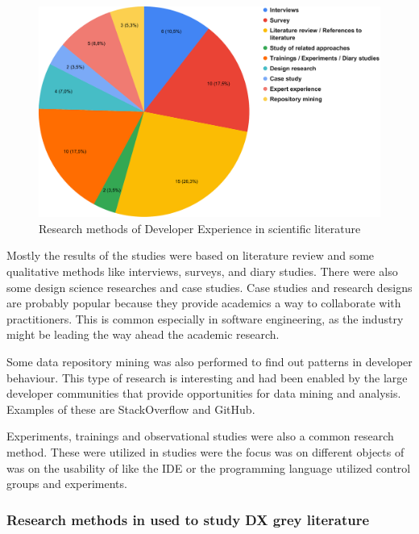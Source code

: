 \documentclass[english, 12pt, a4paper, sci, utf8, a-1b, online]{aaltothesis}
\begin{document}
\begin{figure}[ht]
  \begin{center}
    \includegraphics[width=\textwidth]{research-methods-scientific.pdf}
  \end{center}
  \captionsetup{width=0.6\textwidth}
  \caption{Research methods of Developer Experience in scientific literature}
\end{figure}

Mostly the results of the studies were based on literature review and some qualitative methods like interviews, surveys, and diary studies. There were also some design science researches and case studies. Case studies and research designs are probably popular because they provide academics a way to collaborate with practitioners. This is common especially in software engineering, as the industry might be leading the way ahead the academic research.

Some data repository mining was also performed to find out patterns in developer behaviour. This type of research is interesting and had been enabled by the large developer communities that provide opportunities for data mining and analysis. Examples of these are StackOverflow and GitHub.

Experiments, trainings and observational studies were also a common research method. These were utilized in studies were the focus was on different objects of  was on the usability of  like the IDE or the programming language utilized control groups and experiments.

\subsubsection{Research methods in used to study DX grey literature}
\end{document}
